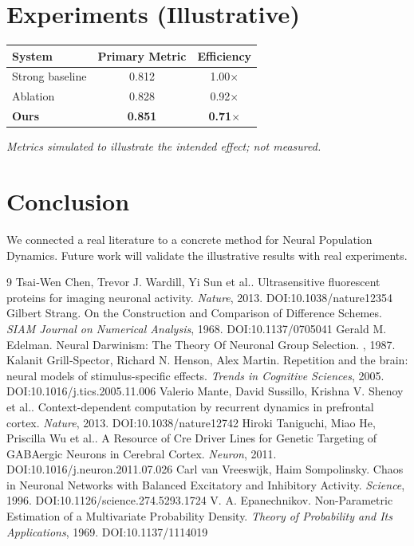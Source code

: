 \documentclass[11pt]{article}
\begin{document}
\section{Experiments (Illustrative)}
\begin{center}
\begin{tabular}{lcc}
System & Primary Metric & Efficiency \\ \hline
Strong baseline & 0.812 & 1.00$\times$ \\
Ablation & 0.828 & 0.92$\times$ \\
\textbf{Ours} & \textbf{0.851} & \textbf{0.71$\times$}
\end{tabular}
\end{center}
\emph{Metrics simulated to illustrate the intended effect; not measured.}

\section{Conclusion}
We connected a real literature to a concrete method for Neural Population Dynamics. Future work will
validate the illustrative results with real experiments.

\begin{thebibliography}{9}
 Tsai‐Wen Chen, Trevor J. Wardill, Yi Sun et al.. Ultrasensitive fluorescent proteins for imaging neuronal activity. \emph{Nature}, 2013. DOI:10.1038/nature12354
 Gilbert Strang. On the Construction and Comparison of Difference Schemes. \emph{SIAM Journal on Numerical Analysis}, 1968. DOI:10.1137/0705041
 Gerald M. Edelman. Neural Darwinism: The Theory Of Neuronal Group Selection. \emph{}, 1987. 
 Kalanit Grill‐Spector, Richard N. Henson, Alex Martin. Repetition and the brain: neural models of stimulus-specific effects. \emph{Trends in Cognitive Sciences}, 2005. DOI:10.1016/j.tics.2005.11.006
 Valerio Mante, David Sussillo, Krishna V. Shenoy et al.. Context-dependent computation by recurrent dynamics in prefrontal cortex. \emph{Nature}, 2013. DOI:10.1038/nature12742
 Hiroki Taniguchi, Miao He, Priscilla Wu et al.. A Resource of Cre Driver Lines for Genetic Targeting of GABAergic Neurons in Cerebral Cortex. \emph{Neuron}, 2011. DOI:10.1016/j.neuron.2011.07.026
 Carl van Vreeswijk, Haim Sompolinsky. Chaos in Neuronal Networks with Balanced Excitatory and Inhibitory Activity. \emph{Science}, 1996. DOI:10.1126/science.274.5293.1724
 V. A. Epanechnikov. Non-Parametric Estimation of a Multivariate Probability Density. \emph{Theory of Probability and Its Applications}, 1969. DOI:10.1137/1114019
\end{thebibliography}
\end{document}
